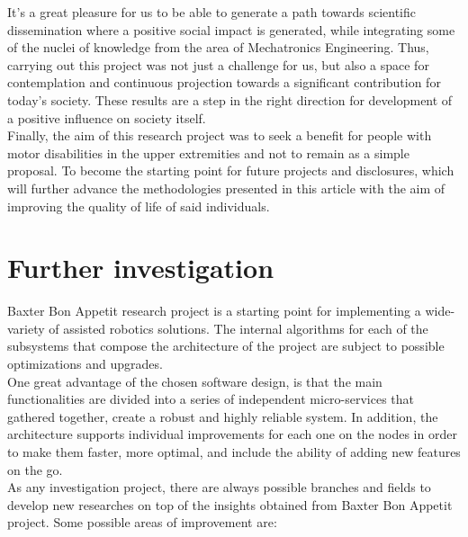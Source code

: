 \documentclass[11pt]{report} %
\begin{document}
It's a great pleasure for us to be able to generate a path towards scientific dissemination where a positive social impact is generated, while integrating some of the nuclei of knowledge from the area of Mechatronics Engineering. Thus, carrying out this project was not just a challenge for us, but also a space for contemplation and continuous projection towards a significant contribution for today's society. These results are a step in the right direction for development of a positive influence on society itself.\\

Finally, the aim of this research project was to seek a benefit for people with motor disabilities in the upper extremities and not to remain as a simple proposal. To become the starting point for future projects and disclosures, which will further advance the methodologies presented in this article with the aim of improving the quality of life of said individuals.\\


\chapter{Further investigation}
Baxter Bon Appetit research project is a starting point for implementing a wide-variety of assisted robotics solutions. The internal algorithms for each of the subsystems that compose the architecture of the project are subject to possible optimizations and upgrades.\\

One great advantage of the chosen software design, is that the main functionalities are divided into a series of independent micro-services that gathered together, create a robust and highly reliable system. In addition, the architecture supports individual improvements for each one on the nodes in order to make them faster, more optimal, and include the ability of adding new features on the go.\\

As any investigation project, there are always possible branches and fields to develop new researches on top of the insights obtained from Baxter Bon Appetit project. Some possible areas of improvement are:
\end{document}
